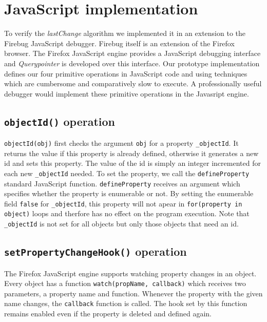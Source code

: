 \documentclass[preprint]{sigplanconf}
\begin{document}
\section{JavaScript implementation}
To verify the \textit{lastChange} algorithm we
implemented it in an extension to the Firebug
JavaScript debugger\cite{Firebug}. %
Firebug itself is an extension of the Firefox browser\cite{Firefox}. %
The Firefox JavaScript engine provides a JavaScript debugging interface \cite{JSD} and
\textit{Querypointer} is developed over this interface. Our prototype implementation defines our four primitive operations in JavaScript code and using techniques which are cumbersome and comparatively slow to execute.  A professionally useful debugger would implement these primitive operations in the Javasript engine.

\subsection{\texttt{objectId()} operation}
\texttt{objectId(obj)} first checks the argument \texttt{obj} for a property \texttt{\_objectId}.
It returns the value if this property is already defined,
otherwise it generates a new id and sets this property. The value of the id is simply an integer incremented 
for each new \texttt{\_objectId} needed. To set %
the property, we call the \texttt{defineProperty} standard JavaScript
function. \texttt{defineProperty} receives an argument which specifies
whether the property is enumerable or not. By setting the enumerable
field \texttt{false} for \texttt{\_objectId}, this property will not
apear in \texttt{for(property in object)} loops and therfore has no
effect on the program execution. Note that \texttt{\_objectId} is
not set for all objects but only those objects that need an id.

\subsection{\texttt{setPropertyChangeHook()} operation}
The Firefox JavaScript engine supports watching property changes in an
object. Every object has a function \texttt{watch(propName, callback)}
which receives two parameters, a property name and function.  Whenever
the property with the given name changes, the \texttt{callback} function is
called. The hook set by this function remains enabled even if the
property is deleted and defined again. 
\end{document}
